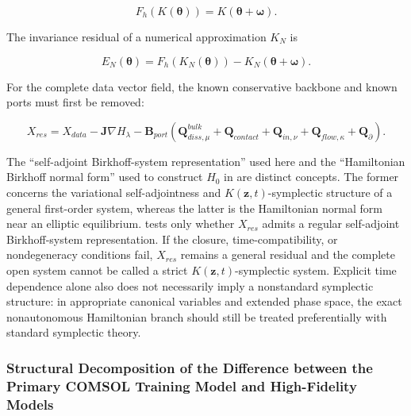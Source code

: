 \begin{equation}
\label{eq:hamiltonian-3-95}
\boxed{F_{h}\left( K\left( \bm{\theta} \right) \right) = K\left( \bm{\theta} + \bm{\omega} \right).}
\end{equation}

The invariance residual of a numerical approximation \(K_{N}\) is

\begin{equation}
\label{eq:hamiltonian-3-96}
E_{N}\left( \bm{\theta} \right) = F_{h}\left( K_{N}\left( \bm{\theta} \right) \right) - K_{N}\left( \bm{\theta} + \bm{\omega} \right).
\end{equation}

For the complete data vector field, the known conservative backbone and known ports must first be removed:

\begin{equation}
\label{eq:hamiltonian-3-97}
\boxed{X_{res} = X_{data} - \mathbf{J}\nabla H_{\lambda} - \mathbf{B}_{port}\left( \mathbf{Q}_{diss,\mu}^{bulk} + \mathbf{Q}_{contact} + \mathbf{Q}_{in,\nu} + \mathbf{Q}_{flow,\kappa} + \mathbf{Q}_{\partial} \right).}
\end{equation}

The ``self-adjoint Birkhoff-system representation'' used here and the ``Hamiltonian Birkhoff normal form'' used to construct \(H_{0}\) in  are distinct concepts. The former concerns the variational self-adjointness and \(K\left( \mathbf{z},t \right)\)-symplectic structure of a general first-order system, whereas the latter is the Hamiltonian normal form near an elliptic equilibrium.  tests only whether \(X_{res}\) admits a regular self-adjoint Birkhoff-system representation. If the closure, time-compatibility, or nondegeneracy conditions fail, \(X_{res}\) remains a general residual and the complete open system cannot be called a strict \(K\left( \mathbf{z},t \right)\)-symplectic system. Explicit time dependence alone also does not necessarily imply a nonstandard symplectic structure: in appropriate canonical variables and extended phase space, the exact nonautonomous Hamiltonian branch should still be treated preferentially with standard symplectic theory.\cite{HairerLubichWanner2006GNI,FengQin2010}

\subsubsection{Structural Decomposition of the Difference between the Primary COMSOL Training Model and High-Fidelity Models}\label{sec:hamiltonian-3-7-6}

